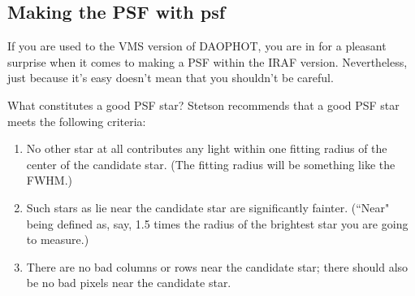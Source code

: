 \subsection{Making the PSF with {\bf psf} }
 
If you are used to the VMS version of DAOPHOT, you are in for a pleasant
surprise when it comes to making a PSF within the IRAF version.
Nevertheless, just because it's easy doesn't mean that you shouldn't be
careful.
 
What constitutes a good PSF star?  Stetson recommends that a good PSF
star meets the following criteria:
\begin{enumerate}
\item No other star at all contributes any light within one fitting
radius of the center of the candidate star. (The fitting radius will be
something like the FWHM.)
\item Such stars as lie near the candidate star are significantly
fainter. (``Near" being defined as, say, 1.5 times the radius of the
brightest star you are going to measure.)
\item There are no bad columns or rows near the candidate star; there
should also be no bad pixels near the candidate star.
\end{enumerate}
 
